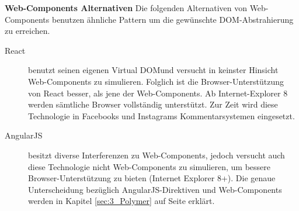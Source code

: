 \textbf{Web-Components Alternativen}
Die folgenden Alternativen von Web-Components benutzen ähnliche Pattern um die gewünschte DOM-Abstrahierung zu erreichen.
\begin{description}
\item[React] benutzt seinen eigenen \glqq Virtual DOM\grqq und versucht in keinster Hinsicht Web-Components zu simulieren. Folglich ist die Browser-Unterstützung von React besser, als jene der Web-Components. Ab Internet-Explorer 8 werden sämtliche Browser vollständig unterstützt. Zur Zeit wird diese Technologie in Facebooks und Instagrams Kommentarsystemen eingesetzt.
\item[AngularJS] besitzt diverse Interferenzen zu Web-Components, jedoch versucht auch diese Technologie nicht Web-Components zu simulieren, um bessere Browser-Unterstützung zu bieten (Internet Explorer 8+). Die genaue Unterscheidung bezüglich AngularJS-Direktiven und Web-Components werden in Kapitel \ref{sec:3_Polymer} auf Seite \pageref{sec:3_Polymer} erklärt.
\end{description}

